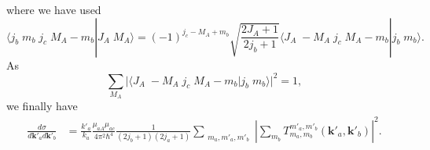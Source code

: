 where we have used
\begin{equation}\label{eqC6AppG49}
\langle j_b\;m_b\;j_c\;M_A-m_b|J_A\;M_A\rangle=(-1)^{j_c-M_A+m_b}\sqrt{\frac{2J_A+1}{2j_b+1}}\langle J_A\;-M_A\;j_c\;M_A-m_b|j_b\;m_b\rangle.
\end{equation}
As
\begin{equation}\label{eqC6AppG50}
\sum_{M_A}\Big|\langle J_A\;-M_A\;j_c\;M_A-m_b|j_b\;m_b\rangle\Big|^2=1,
\end{equation}
we finally have
\begin{equation}\label{eqC6AppG51}
\begin{split}
\frac{d\sigma}{d\mathbf{k}'_ad\mathbf{k}'_b}&=\frac{k'_a}{k_a}\frac{\mu_{aA}\mu_{ac}}{4\pi^2\hbar^4}\frac{1}{(2j_b+1)(2j_a+1)}\sum_{\substack{m_a,m'_a,m'_b}}\left|\sum_{m_b} T_{m_a,m_b}^{m'_a,m'_b}(\mathbf{k}'_a,\mathbf{k}'_b)\right|^2.
\end{split}
\end{equation}
